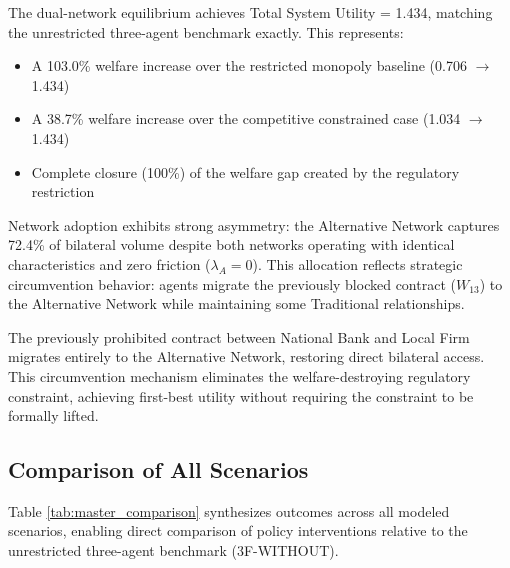 \documentclass[12pt]{article}
\begin{document}
The dual-network equilibrium achieves Total System Utility = 1.434, matching the unrestricted three-agent benchmark exactly. This represents:
\begin{itemize}[noitemsep]
    \item A 103.0\% welfare increase over the restricted monopoly baseline (0.706 $\rightarrow$ 1.434)
    \item A 38.7\% welfare increase over the competitive constrained case (1.034 $\rightarrow$ 1.434)
    \item Complete closure (100\%) of the welfare gap created by the regulatory restriction
\end{itemize}

Network adoption exhibits strong asymmetry: the Alternative Network captures 72.4\% of bilateral volume despite both networks operating with identical characteristics and zero friction ($\lambda_A = 0$). This allocation reflects strategic circumvention behavior: agents migrate the previously blocked contract ($W_{13}$) to the Alternative Network while maintaining some Traditional relationships.

The previously prohibited contract between National Bank and Local Firm migrates entirely to the Alternative Network, restoring direct bilateral access. This circumvention mechanism eliminates the welfare-destroying regulatory constraint, achieving first-best utility without requiring the constraint to be formally lifted.

\subsection{Comparison of All Scenarios}

Table \ref{tab:master_comparison} synthesizes outcomes across all modeled scenarios, enabling direct comparison of policy interventions relative to the unrestricted three-agent benchmark (3F-WITHOUT).
\end{document}
